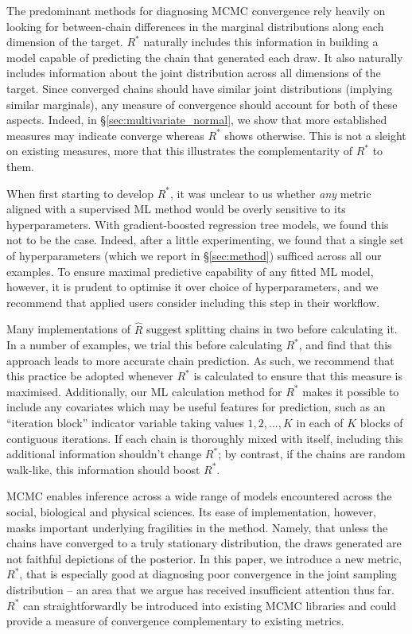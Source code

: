 \documentclass{article}
\begin{document}
The predominant methods for diagnosing MCMC convergence rely heavily on looking for between-chain differences in the marginal distributions along each dimension of the target. $R^*$ naturally includes this information in building a model capable of predicting the chain that generated each draw. It also naturally includes information about the joint distribution across all dimensions of the target. Since converged chains should have similar joint distributions (implying similar marginals), any measure of convergence should account for both of these aspects. Indeed, in \S\ref{sec:multivariate_normal}, we show that more established measures may indicate converge whereas $R^*$ shows otherwise. This is not a sleight on existing measures, more that this illustrates the complementarity of $R^*$ to them.

When first starting to develop $R^*$, it was unclear to us whether \textit{any} metric aligned with a supervised ML method would be overly sensitive to its hyperparameters. With gradient-boosted regression tree models, we found this not to be the case. Indeed, after a little experimenting, we found that a single set of hyperparameters (which we report in \S\ref{sec:method}) sufficed across all our examples. To ensure maximal predictive capability of any fitted ML model, however, it is prudent to optimise it over choice of hyperparameters, and we recommend that applied users consider including this step in their workflow.

Many implementations of $\widehat{R}$ suggest splitting chains in two before calculating it. In a number of examples, we trial this before calculating $R^*$, and find that this approach leads to more accurate chain prediction. As such, we recommend that this practice be adopted whenever $R^*$ is calculated to ensure that this measure is maximised. Additionally, our ML calculation method for $R^*$ makes it possible to include any covariates which may be useful features for prediction, such as an ``iteration block'' indicator variable taking values $1, 2, ..., K$ in each of $K$ blocks of contiguous iterations. If each chain is thoroughly mixed with itself, including this additional information shouldn't change $R^*$; by contrast, if the chains are random walk-like, this information should boost $R^*$.

MCMC enables inference across a wide range of models encountered across the social, biological and physical sciences. Its ease of implementation, however, masks important underlying fragilities in the method. Namely, that unless the chains have converged to a truly stationary distribution, the draws generated are not faithful depictions of the posterior. In this paper, we introduce a new metric, $R^*$, that is especially good at diagnosing poor convergence in the joint sampling distribution -- an area that we argue has received insufficient attention thus far. $R^*$ can straightforwardly be introduced into existing MCMC libraries and could provide a measure of convergence complementary to existing metrics.

	

 
	
\end{document}
